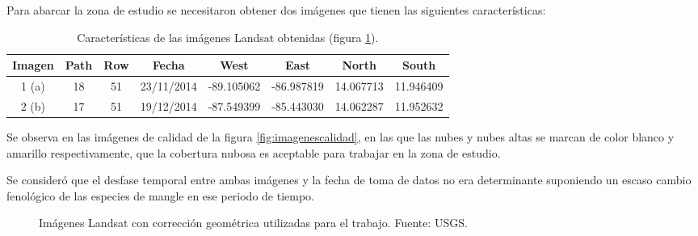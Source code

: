Para abarcar la zona de estudio se necesitaron obtener dos imágenes que tienen las siguientes características:

\begin{table}[ht]
	\centering
	\caption[Caracerísticas de las imágenes Landsat]{Características de las imágenes Landsat obtenidas (figura \ref{fig:imagenesLandsat}).}
	\begin{tabular}{@{}cccccccc@{}}
	\toprule[0.4mm]
	Imagen & Path & Row & Fecha & West & East & North & South \\
	\midrule
	1 (a) & 18 & 51 & 23/11/2014 & -89.105062 & -86.987819 & 14.067713 & 11.946409 \\
	2 (b) & 17 & 51 & 19/12/2014 & -87.549399 & -85.443030 & 14.062287 & 11.952632 \\
	\bottomrule[0.4mm]
	\end{tabular}
	\label{tab:imagenes}
\end{table}

Se observa en las imágenes de calidad de la figura \ref{fig:imagenescalidad}, en las que las nubes y nubes altas se marcan de color blanco y amarillo respectivamente, que la cobertura nubosa es aceptable para trabajar en la zona de estudio.\Sep

Se consideró que el desfase temporal entre ambas imágenes y la fecha de toma de datos no era determinante suponiendo un escaso cambio fenológico de las especies de mangle en ese periodo de tiempo.\Sep

\begin{figure}
	\centering
	\caption[Imágenes Landsat]{Imágenes Landsat con corrección geométrica utilizadas para el trabajo. Fuente: USGS.}
	\label{fig:imagenesLandsat}
\end{figure}

